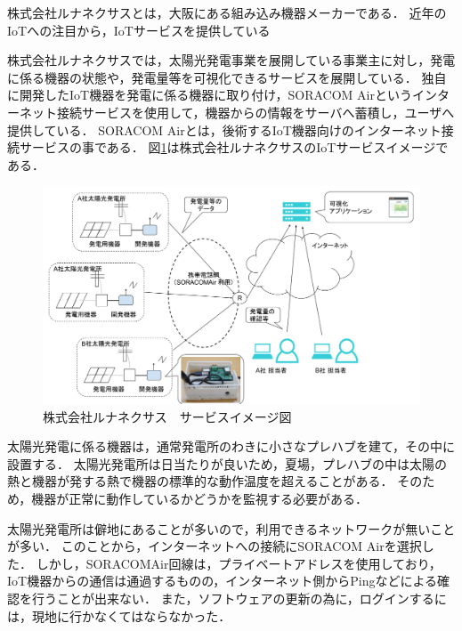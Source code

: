 株式会社ルナネクサスとは，大阪にある組み込み機器メーカーである．
近年のIoTへの注目から，IoTサービスを提供している

株式会社ルナネクサスでは，太陽光発電事業を展開している事業主に対し，発電に係る機器の状態や，発電量等を可視化できるサービスを展開している．
独自に開発したIoT機器を発電に係る機器に取り付け，SORACOM Airというインターネット接続サービスを使用して，機器からの情報をサーバへ蓄積し，ユーザへ提供している．
SORACOM Airとは，後術するIoT機器向けのインターネット接続サービスの事である．
図\ref{fig:lunafig}は株式会社ルナネクサスのIoTサービスイメージである．
\begin{figure}[htbp]
\includegraphics[width=16cm]{images/lunafig.png}
\caption{株式会社ルナネクサス　サービスイメージ図}
\label{fig:lunafig}
\end{figure}



太陽光発電に係る機器は，通常発電所のわきに小さなプレハブを建て，その中に設置する．
太陽光発電所は日当たりが良いため，夏場，プレハブの中は太陽の熱と機器が発する熱で機器の標準的な動作温度を超えることがある．
そのため，機器が正常に動作しているかどうかを監視する必要がある．

太陽光発電所は僻地にあることが多いので，利用できるネットワークが無いことが多い．
このことから，インターネットへの接続にSORACOM Airを選択した．
しかし，SORACOMAir回線は，プライベートアドレスを使用しており，IoT機器からの通信は通過するものの，インターネット側からPingなどによる確認を行うことが出来ない．
また，ソフトウェアの更新の為に，ログインするには，現地に行かなくてはならなかった．

